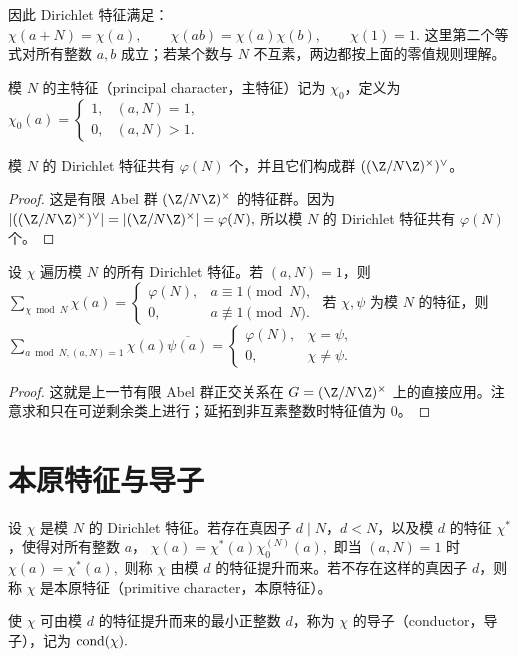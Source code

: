 因此 Dirichlet 特征满足：
\(
  \chi(a+N)=\chi(a),\qquad
  \chi(ab)=\chi(a)\chi(b),\qquad
  \chi(1)=1.
\)
这里第二个等式对所有整数 $a,b$ 成立；若某个数与 $N$ 不互素，两边都按上面的零值规则理解。

\begin{definition}
模 $N$ 的主特征（principal character，主特征）记为 $\chi_0$，定义为
\(
  \chi_0(a)=
  \begin{cases}
    1,&(a,N)=1,\\
    0,&(a,N)>1.
  \end{cases}
\)
\end{definition}

\begin{proposition}
模 $N$ 的 Dirichlet 特征共有 $\varphi(N)$ 个，并且它们构成群 $(\U N)^\vee$。
\end{proposition}

\begin{proof}
这是有限 Abel 群 $\U N$ 的特征群。因为
\(
  |(\U N)^\vee|=|\U N|=\varphi(N),
\)
所以模 $N$ 的 Dirichlet 特征共有 $\varphi(N)$ 个。
\end{proof}

\begin{theorem}
设 $\chi$ 遍历模 $N$ 的所有 Dirichlet 特征。若 $(a,N)=1$，则
\(
  \sum_{\chi\bmod N}\chi(a)
  =
  \begin{cases}
    \varphi(N),& a\equiv 1\pmod N,\\
    0,& a\not\equiv 1\pmod N.
  \end{cases}
\)
若 $\chi,\psi$ 为模 $N$ 的特征，则
\(
  \sum_{a\bmod N,\allowbreak{}(a,N)=1}
  \chi(a)\overline{\psi(a)}
  =
  \begin{cases}
    \varphi(N),& \chi=\psi,\\
    0,& \chi\ne\psi.
  \end{cases}
\)
\end{theorem}

\begin{proof}
这就是上一节有限 Abel 群正交关系在
\(
  G=\U N
\)
上的直接应用。注意求和只在可逆剩余类上进行；延拓到非互素整数时特征值为 $0$。
\end{proof}

\section{本原特征与导子}

\begin{definition}
设 $\chi$ 是模 $N$ 的 Dirichlet 特征。若存在真因子 $d\mid N$，$d<N$，以及模 $d$ 的特征 $\chi^\ast$，使得对所有整数 $a$，
\(
  \chi(a)=\chi^\ast(a)\chi_0^{(N)}(a),
\)
即当 $(a,N)=1$ 时
\(
  \chi(a)=\chi^\ast(a),
\)
则称 $\chi$ 由模 $d$ 的特征提升而来。若不存在这样的真因子 $d$，则称 $\chi$ 是本原特征（primitive character，本原特征）。

使 $\chi$ 可由模 $d$ 的特征提升而来的最小正整数 $d$，称为 $\chi$ 的导子（conductor，导子），记为
\(
  \operatorname{cond}(\chi).
\)
\end{definition}

